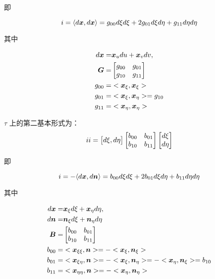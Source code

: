 \documentclass{article}
\begin{document}
即

$$
\uppercase\expandafter{\romannumeral1} 
= \langle d\bfx, d\bfx \rangle = g_{00} d\xi d\xi+  2g_{01} d\xi d\eta  + g_{11} d\eta d\eta 
$$

其中

\begin{align*}
	d{\boldsymbol x} = & {\boldsymbol x}_u du +{\boldsymbol x}_v dv,\\
    {\boldsymbol G} = & 
    \begin{bmatrix}
        g_{00} & g_{01} \\
        g_{10} & g_{11} 
    \end{bmatrix}\\
    g_{00} = & <{\boldsymbol x}_\xi, {\boldsymbol x}_\xi> \\
    g_{01} = & <{\boldsymbol x}_\xi, {\boldsymbol x}_\eta> = g_{10}\\
    g_{11} = & <{\boldsymbol x}_\eta, {\boldsymbol x}_\eta> 
\end{align*}

$\tau$ 上的第二基本形式为：
\begin{align*}
    \uppercase\expandafter{\romannumeral2} =
    \begin{bmatrix}
        d\xi , d\eta
    \end{bmatrix}
     \begin{bmatrix}
        b_{00} & b_{01} \\
        b_{10} & b_{11} 
    \end{bmatrix}   
    \begin{bmatrix}
        d\xi \\ d\eta
    \end{bmatrix}
\end{align*}

即

$$
\uppercase\expandafter{\romannumeral1} = -\langle d\bfx, d\bfn \rangle = b_{00} d\xi d\xi+  2b_{01} d\xi d\eta  +
b_{11} d\eta d\eta 
$$

其中

\begin{align*}
	d{\boldsymbol x} = & {\boldsymbol x}_\xi d\xi +{\boldsymbol x}_\eta d\eta, \\
	d{\boldsymbol n} = & {\boldsymbol n}_\xi d\xi + {\boldsymbol n}_\eta d\eta \\
    {\boldsymbol B} = & 
    \begin{bmatrix}
        b_{00} & b_{01} \\
        b_{10} & b_{11} 
    \end{bmatrix}\\
	b_{00} = & <{\boldsymbol x}_{\xi \xi},{\boldsymbol n}> = -<{\boldsymbol x}_\xi,{\boldsymbol n}_\xi> \\
	b_{01} = & <{\boldsymbol x}_{\xi \eta},{\boldsymbol n}> = -<{\boldsymbol x}_\xi,{\boldsymbol n}_\eta> = - <{\boldsymbol x}_\eta,{\boldsymbol n}_\xi> =b_{10}\\
	b_{11} = & <{\boldsymbol x}_{\eta \eta},{\boldsymbol n}> = -<{\boldsymbol x}_\eta,{\boldsymbol n}_\eta> 
\end{align*}
\end{document}

